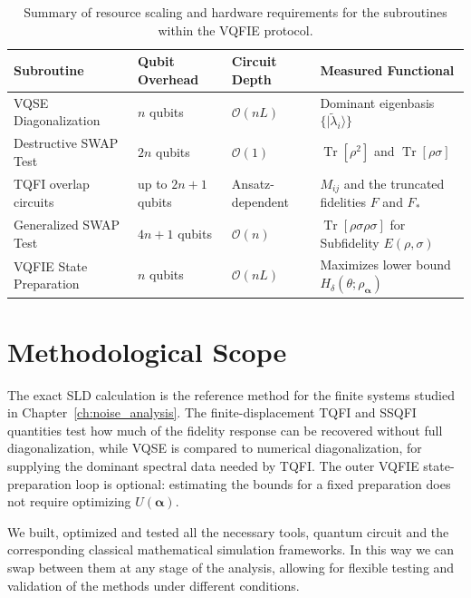 \begin{table}[h!]
    \centering
    \caption{Summary of resource scaling and hardware requirements for the subroutines within the VQFIE protocol.}
    \label{tab:resource_scaling}
    \begin{tabular}{p{3cm} p{2cm} p{2cm} p{5cm}}
        \toprule
        \textbf{Subroutine}     & \textbf{Qubit Overhead} & \textbf{Circuit Depth} & \textbf{Measured Functional}                                               \\
        \midrule
        VQSE Diagonalization    & $n$ qubits              & $\mathcal{O}(n L)$     & Dominant eigenbasis $\{|\tilde{\lambda}_i\rangle\}$                        \\
        Destructive SWAP Test   & $2n$ qubits             & $\mathcal{O}(1)$       & $\operatorname{Tr}[\rho^2]$ and $\operatorname{Tr}[\rho\sigma]$            \\
        TQFI overlap circuits   & up to $2n+1$ qubits     & Ansatz-dependent       & $M_{ij}$ and the truncated fidelities $F$ and $F_*$                        \\
        Generalized SWAP Test   & $4n + 1$ qubits         & $\mathcal{O}(n)$       & $\operatorname{Tr}[\rho\sigma\rho\sigma]$ for Subfidelity $E(\rho,\sigma)$ \\
        VQFIE State Preparation & $n$ qubits              & $\mathcal{O}(n L)$     & Maximizes lower bound $H_\delta(\theta; \rho_{\boldsymbol{\alpha}})$       \\
        \bottomrule
    \end{tabular}
\end{table}

\section{Methodological Scope}
The exact SLD calculation is the reference method for the finite systems studied in Chapter~\ref{ch:noise_analysis}. The finite-displacement TQFI and SSQFI quantities test how much of the fidelity response can be recovered without full diagonalization, while VQSE is compared to numerical diagonalization, for supplying the dominant spectral data needed by TQFI. The outer VQFIE state-preparation loop is optional: estimating the bounds for a fixed preparation does not require optimizing $U(\boldsymbol{\alpha})$.

We built, optimized and tested all the necessary tools, quantum circuit and the corresponding classical mathematical simulation frameworks. In this way we can swap between them at any stage of the analysis, allowing for flexible testing and validation of the methods under different conditions.
